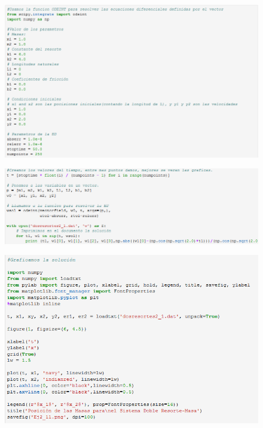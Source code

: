 \documentclass[12pt]{article}
\begin{document}
\begin{figure}[h!]
    \centering
\includegraphics[width=6in]{Cod2.png}
\end{figure}

\begin{figure}[h!]
    \centering
\includegraphics[width=6in]{Cod3.png}
\end{figure}

\clearpage

\begin{figure}[h!]
    \centering
\includegraphics[width=6in]{Cod4.png}
\end{figure}
\end{document}
